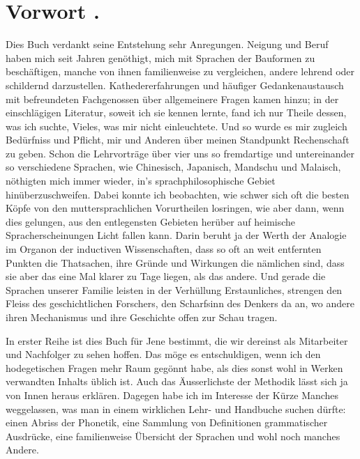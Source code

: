 \chapter*{Vorwort .}

  Dies Buch verdankt seine Entstehung sehr  Anregungen. Neigung und Beruf haben mich seit Jahren genöthigt, mich mit Sprachen der  Bauformen zu beschäftigen, manche von ihnen familienweise zu vergleichen, andere lehrend oder schildernd darzustellen. Kathedererfahrungen und häufiger Gedankenaustausch mit befreundeten Fachgenossen über allgemeinere Fragen kamen hinzu; in der einschlägigen Literatur, soweit ich sie kennen lernte, fand ich nur Theile dessen, was ich suchte, Vieles, was mir nicht einleuchtete. Und so wurde es mir zugleich Bedürfniss und Pflicht, mir und Anderen über meinen Standpunkt Rechenschaft zu geben. Schon die Lehrvorträge über vier uns so fremdartige und untereinander so verschiedene Sprachen, wie Chinesisch, Japanisch, Mandschu und Malaisch, nöthigten mich immer wieder, in’s sprachphilosophische Gebiet hinüberzuschweifen. Dabei konnte ich beobachten, wie schwer sich oft die besten Köpfe von den muttersprachlichen Vorurtheilen losringen, wie aber dann, wenn dies gelungen, aus den entlegensten Gebieten herüber auf heimische Spracherscheinungen Licht fallen kann. Darin beruht ja der Werth der Analogie im Organon der inductiven Wissenschaften, dass so oft an weit entfernten Punkten die Thatsachen, ihre Gründe und Wirkungen die nämlichen sind, dass sie aber das eine Mal klarer zu Tage liegen, als das andere. Und gerade die Sprachen unserer Familie leisten in der Verhüllung Erstaunliches, strengen den Fleiss des geschichtlichen Forschers, den Scharfsinn des Denkers da an, wo andere ihren Mechanismus und ihre Geschichte offen zur Schau tragen.

In erster Reihe ist dies Buch für Jene bestimmt, die wir dereinst als Mitarbeiter und Nachfolger zu sehen hoffen. Das möge es entschuldigen, wenn ich den hodegetischen Fragen mehr Raum gegönnt  habe, als dies sonst wohl in Werken verwandten Inhalts üblich ist. Auch das Äusserlichste der Methodik lässt sich ja von Innen heraus erklären. Dagegen habe ich im Interesse der Kürze Manches weggelassen, was man in einem wirklichen Lehr- und Handbuche suchen dürfte: einen Abriss der Phonetik, eine Sammlung von  Definitionen grammatischer Ausdrücke, eine familienweise Übersicht der Sprachen und wohl noch manches Andere.


